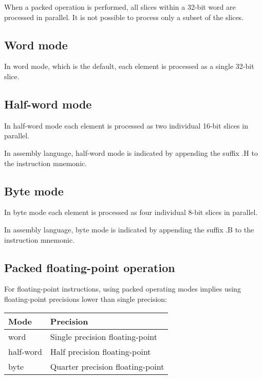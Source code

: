 When a packed operation is performed, all slices within a 32-bit word are
processed in parallel. It is not possible to process only a subset of the
slices.

\subsection{Word mode}

In word mode, which is the default, each element is processed as a single
32-bit slice.

\subsection{Half-word mode}

In half-word mode each element is processed as two individual 16-bit slices in
parallel.

In assembly language, half-word mode is indicated by appending the suffix .H
to the instruction mnemonic.

\subsection{Byte mode}

In byte mode each element is processed as four individual 8-bit slices in
parallel.

In assembly language, byte mode is indicated by appending the suffix .B to the
instruction mnemonic.

\subsection{Packed floating-point operation}

For floating-point instructions, using packed operating modes implies using
floating-point precisions lower than single precision:

\begin{tabular}{|l|l|}
  \hline
  \textbf{Mode} & \textbf{Precision} \\
  \hline
  word & Single precision floating-point \\
  \hline
  half-word & Half precision floating-point \\
  \hline
  byte & Quarter precision floating-point \\
  \hline
\end{tabular}
